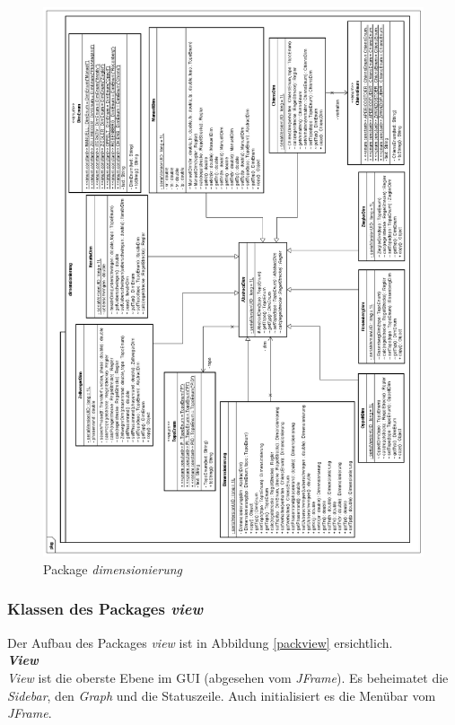 \begin{figure}[p]
\centering
\includegraphics[width=1\textwidth]{packdim.png}
\caption{Package \textit{dimensionierung}}
\label{packdim}
\end{figure}

\newpage
\subsubsection{Klassen des Packages \textit{view}}
Der Aufbau des Packages \textit{view} ist in Abbildung \ref{packview} ersichtlich.\\

\textit{\textbf{View}}\\
\textit{View} ist die oberste Ebene im GUI (abgesehen vom \textit{JFrame}). Es beheimatet die \textit{Sidebar}, den \textit{Graph} und die Statuszeile. Auch initialisiert es die Menübar vom \textit{JFrame}.\\

